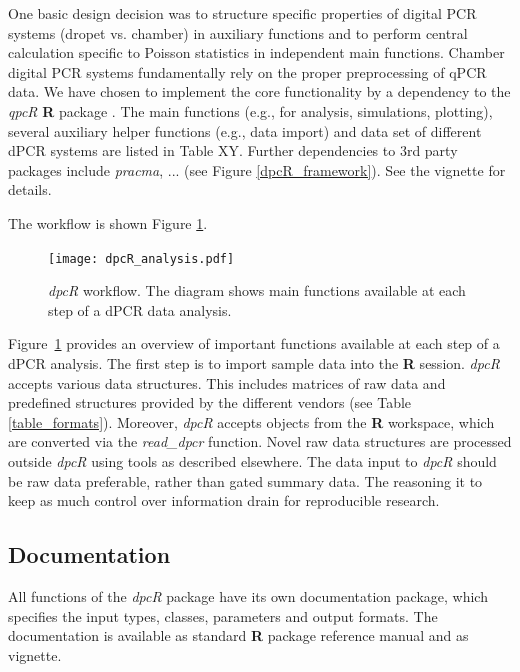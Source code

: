 \documentclass[a4,center,fleqn]{NAR}
\begin{document}
One basic design decision was to structure specific properties of digital PCR 
systems (dropet vs. chamber) in auxiliary functions and to perform central 
calculation specific to Poisson statistics in independent main functions. 
Chamber digital PCR systems fundamentally rely on the proper preprocessing of 
qPCR data. We have chosen to implement the core functionality by a dependency to 
the \textit{qpcR} \textbf{R} package \cite{ritz_qpcr_2008}. The main functions 
(e.g., for analysis, simulations, plotting), several auxiliary helper functions 
(e.g., data import) and data set of different dPCR systems are listed in Table 
XY. Further dependencies to 3rd party packages include \textit{pracma}, ... (see 
Figure \ref{dpcR_framework}). See the vignette for details.

The workflow is shown Figure \ref{workflow}.

\begin{figure}[t]
\begin{center}
\texttt{[image: dpcR\_analysis.pdf]}
\end{center}
\caption{\textit{dpcR} workflow. The diagram shows main functions 
available at each step of a dPCR data analysis.}
\label{workflow}
\end{figure}

Figure~\ref{workflow} provides an overview of important functions available at 
each step of a dPCR analysis. The first step is to import sample data into the 
\textbf{R} session. \textit{dpcR} accepts various data structures. This includes 
matrices of raw data and predefined structures provided by the different vendors 
(see Table \ref{table_formats}). Moreover, \textit{dpcR} accepts objects from 
the \textbf{R} workspace, which are converted via the \textit{read\_dpcr} 
function. Novel raw data structures are processed outside \textit{dpcR} using 
tools as described elsewhere. The data input to \textit{dpcR} should be raw data 
preferable, rather than gated summary data. The reasoning it to keep as much 
control over information drain for reproducible research.

\subsection{Documentation}

All functions of the \textit{dpcR} package have its own documentation package, 
which specifies the input types, classes, parameters and output formats. The 
documentation is available as standard \textbf{R} package reference manual and 
as vignette.
\end{document}
